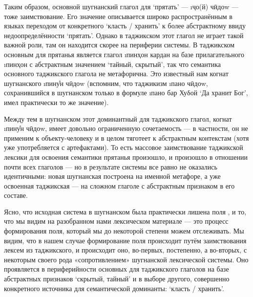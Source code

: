 Таким образом, основной шугнанский глагол для ‘прятать’ — \i{ҷо(й) чӣдоw} — тоже заимствование. Его значение описывается широко распространённым в языках переходом от конкретного ‘класть / хранить’ к более абстрактному ввиду недоопределённости ‘прятать’. Однако в таджикском этот глагол не играет такой важной роли, там он находится скорее на периферии системы. В таджикском основным для прятанья является глагол \i{пинҳон кардан} на базе прилагательного \i{пинҳон} с абстрактным значением ‘тайный, скрытый’, так что семантика основного таджикского глагола не метафорична. Это известный нам когнат шугнанского \i{пину̊н чӣдоw} (вспомним, что таджикизм \i{пано чӣдоw}, сохранившийся в шугнанском только в формуле \i{пано бар Хуδой} ‘Да хранит Бог’, имел практически то же значение).

Между тем в шугнанском этот доминантный для таджикского глагол, когнат \i{пину̊н чӣдоw}, имеет довольно ограниченную сочетаемость — в частности, он не применим к объекту-человеку и в целом тяготеет к абстрактным контекстам (хотя уже употребляется с артефактами). То есть массовое заимствование таджикской лексики для освоения семантики прятанья произошло, и произошло в отношении почти всех глаголов — но в результате системы все равно не оказались идентичными: новая шугнанская построена на именной метафоре, а уже освоенная таджикская — на сложном глаголе с абстрактным признаком в его составе.

Ясно, что исходная система в шугнанском была практически лишена поля , и то, что мы видим на разобранном нами лексическом материале — это процесс формирования поля, который мы до некоторой степени можем отслеживать. Мы видим, что в нашем случае формирование поля происходит путём заимствования лексем из таджикского, и происходит оно, во-первых, постепенно, а во-вторых, с некоторым своего рода «сопротивлением» шугнанской лексической системы. Оно проявляется в периферийности основных для таджикского глаголов на базе абстрактных признаков ‘скрытый, тайный’ и в выборе другого, совершенно конкретного источника для семантической доминанты: ‘класть / хранить’.

